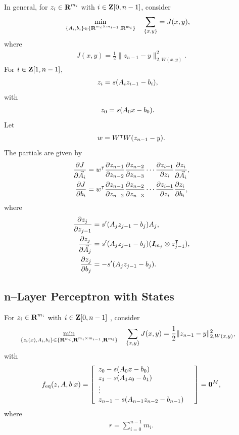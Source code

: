 \documentclass{article}
\begin{document}
    In general, for $z_i\in\textbf{R}^{m_i}$ with $i\in\textbf{Z}[0,n-1]$, consider
    \begin{align*}
        \min_{\{A_i,b_i\}\in\{\textbf{R}^{m_i\times m_{i-1}},\textbf{R}^{m_i}\}}\quad 
        \sum_{\{x,y\}}&=J(x,y),
    \end{align*}
    where
    \begin{align*}
        J(x,y)=\frac{1}{2}\|z_{n-1}-y \|_{2,W(x,y)}^2.
    \end{align*}
    For $i\in\textbf{Z}[1,n-1]$,
    \begin{align*}
        z_i&=s(A_iz_{i-1}-b_i),
    \end{align*}
    with
    \begin{align*}
        z_0&=s(A_0x-b_0).
    \end{align*}
    Let
    \begin{align*}
        w=  W^\intercal W (z_{n-1}-y).
    \end{align*}
    The partials are given by
    \begin{align*}
        \frac{\partial  J }{\partial \vec{A}_i}&=w^\intercal \frac{\partial z_{n-1}}{\partial z_{n-2}}\frac{\partial z_{n-2}}{\partial z_{n-3}}\cdots
        \frac{\partial z_{i+1}}{\partial z_i}\frac{\partial z_i}{\partial \vec{A}_i},\\
        \frac{\partial  J }{\partial b_i}&=w^\intercal \frac{\partial z_{n-1}}{\partial z_{n-2}}\frac{\partial z_{n-2}}{\partial z_{n-3}}\cdots
        \frac{\partial z_{i+1}}{\partial z_i}\frac{\partial z_i}{\partial b_i},
    \end{align*}
    where
    \begin{align*}
        \frac{\partial z_j}{\partial z_{j-1}}&=s'(A_jz_{j-1} -b_j)A_j,\\
        \frac{\partial z_j}{\partial \vec{A}_j}&=s'(A_jz_{j-1} -b_j)(\emph{\textbf{I}}_{m_j}\otimes z_{j-1} ^\intercal),\\
        \frac{\partial z_j}{\partial b_j}&=-s'(A_jz_{j-1} -b_j).
    \end{align*}

\subsection{n--Layer Perceptron with States}

    For $z_i\in\textbf{R}^{m_i}$ with $i\in\textbf{Z}[0,n-1]$ , consider
    \begin{align*}
        \min_{\{z_i(x),A_i,b_i\}\in\{\textbf{R}^{m_i},\textbf{R}^{m_i\times m_{i-1}},\textbf{R}^{m_i}\}}
        \quad \sum_{\{x,y\}}
        J (x,y)&=\frac{1}{2}\|z_{n-1}-y \|_{2,W(x,y)}^2,
    \end{align*}
    with
    \begin{align*}
        f_{\text{eq}}(z,A,b|x)=\left[\begin{array}{lllllllllllllllllll}
        z_0-s(A_0x-b_0)\\
        z_1-s(A_1z_0-b_1)\\
        \vdots&\\
        z_{n-1}-s(A_{n-1}z_{n-2}-b_{n-1})\end{array}\right]=\textbf{0}^M,
    \end{align*}
    where
    \begin{align*}
        r=\sum_{i=0}^{n-1}m_i.
    \end{align*}
\end{document}
